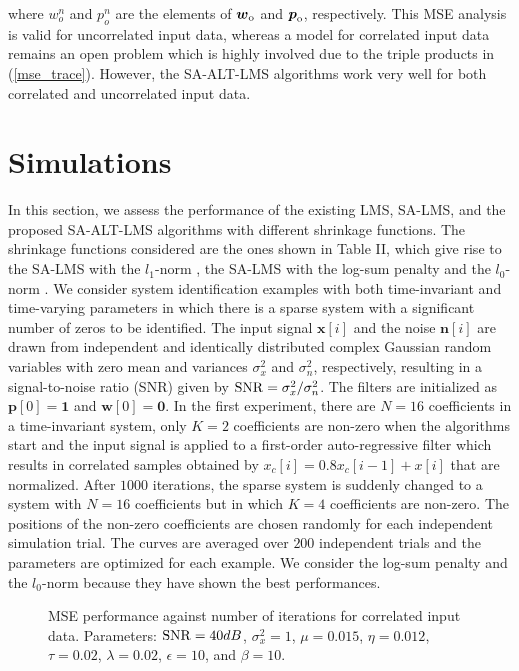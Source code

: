 \documentclass[10pt,onecolumn]{IEEEtran}
\begin{document}
where $w_o^{n}$ and $p_{o}^n$ are the elements of ${\boldsymbol
w}_{\rm o}$ and ${\boldsymbol p}_{\rm o}$, respectively. This MSE
analysis is valid for uncorrelated input data, whereas a model for
correlated input data remains an open problem which is highly
involved due to the triple products in (\ref{mse_trace}). However,
the SA-ALT-LMS algorithms work very well for both correlated and
uncorrelated input data.

\section{Simulations}

In this section, we assess the performance of the existing LMS,
SA-LMS, and the proposed SA-ALT-LMS algorithms with different
shrinkage functions. The shrinkage functions considered are the ones
shown in Table II, which give rise to the SA-LMS with the $l_1$-norm
\cite{chen}, {the SA-LMS with the log-sum penalty
\cite{chen,eksioglu,candes} and the $l_0$-norm \cite{gu,eksioglu2}.}
We consider system identification examples with both time-invariant
and time-varying parameters in which there is a sparse system with a
significant number of zeros to be identified. The input signal
${\boldsymbol x}[i]$ and the noise ${\boldsymbol n}[i]$ are drawn
from independent and identically distributed complex Gaussian random
variables with zero mean and variances $\sigma_x^2$ and
$\sigma_n^2$, respectively, resulting in a signal-to-noise ratio
(SNR) given by ${\rm SNR} =\sigma_x^2/\sigma_n^2$. {The filters are
initialized as ${\boldsymbol p}[0]= {\boldsymbol 1}$ and
${\boldsymbol w}[0]= {\boldsymbol 0}$.} In the first experiment,
there are $N=16$ coefficients in a time-invariant system, only $K=2$
coefficients are non-zero when the algorithms start and the input
signal is applied to a first-order auto-regressive filter which
results in correlated samples obtained by $x_c[i] = 0.8x_c[i-1] +
x[i]$ that are normalized. After $1000$ iterations, the sparse
system is suddenly changed to a system with $N=16$ coefficients but
in which $K=4$ coefficients are non-zero. The positions of the
non-zero coefficients are chosen randomly for each independent
simulation trial. The curves are averaged over $200$ independent
trials and the parameters are optimized for each example. {We
consider the log-sum penalty \cite{chen,eksioglu,candes} and the
$l_0$-norm \cite{gu,eksioglu2} because they have shown the best
performances.}


\begin{figure}[!htb]
\begin{center}
\def\epsfsize#1#2{0.875\columnwidth}
 \vspace{-1.5em}\caption{MSE performance against
number of iterations for correlated input data. Parameters: ${\rm
SNR}=40 dB$, $\sigma_x^2=1$, $\mu = 0.015$, $\eta = 0.012$, $\tau =
0.02$, $\lambda=0.02$, $\epsilon = 10$, and $\beta = 10$.
}\label{fig2}
\end{center}
\end{figure}
\end{document}

